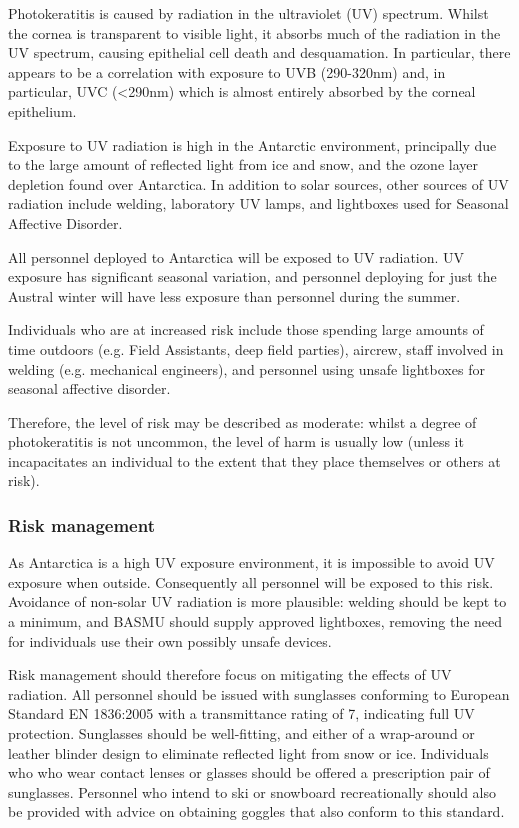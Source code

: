 \documentclass[12pt,a4paper]{article}
\begin{document}
Photokeratitis is caused by radiation in the ultraviolet (UV) spectrum. Whilst the cornea is transparent to visible light, it absorbs much of the radiation in the UV spectrum, causing epithelial cell death and desquamation. In particular, there appears to be a correlation with exposure to UVB (290-320nm) and, in particular, UVC (<290nm) which is almost entirely absorbed by the corneal epithelium.

Exposure to UV radiation is high in the Antarctic environment, principally due to the large amount of reflected light from ice and snow, and the ozone layer depletion found over Antarctica.\cite{Farman:1985uf} In addition to solar sources, other sources of UV radiation include welding, laboratory UV lamps, and lightboxes used for Seasonal Affective Disorder.

All personnel deployed to Antarctica will be exposed to UV radiation. UV exposure has significant seasonal variation, and personnel deploying for just the Austral winter will have less exposure than personnel during the summer.\cite{Puskeppeleit:1992uv}

Individuals who are at increased risk include those spending large amounts of time outdoors (e.g. Field Assistants, deep field parties),\cite{Moehrle:2003cn} aircrew, staff involved in welding (e.g. mechanical engineers), and personnel using unsafe lightboxes for seasonal affective disorder.

Therefore, the level of risk may be described as moderate: whilst a degree of photokeratitis is not uncommon, the level of harm is usually low (unless it incapacitates an individual to the extent that they place themselves or others at risk).

\subsubsection{Risk management}

As Antarctica is a high UV exposure environment, it is impossible to avoid UV exposure when outside. Consequently all personnel will be exposed to this risk. Avoidance of non-solar UV radiation is more plausible: welding should be kept to a minimum, and BASMU should supply approved lightboxes, removing the need for individuals use their own possibly unsafe devices.

Risk management should therefore focus on mitigating the effects of UV radiation. All personnel should be issued with sunglasses conforming to European Standard EN 1836:2005 with a transmittance rating of 7, indicating full UV protection. Sunglasses should be well-fitting, and either of a wrap-around or leather blinder design to eliminate reflected light from snow or ice. Individuals who who wear contact lenses or glasses should be offered a prescription pair of sunglasses. Personnel who intend to ski or snowboard recreationally should also be provided with advice on obtaining goggles that also conform to this standard.
\end{document}
